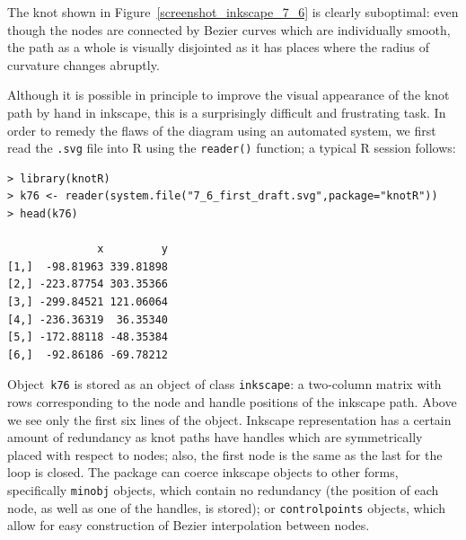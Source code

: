 \documentclass{birkjour}
\theoremstyle{definition}
\theoremstyle{remark}
\numberwithin{equation}{section}
\begin{document}
The knot shown in Figure~\ref{screenshot_inkscape_7_6} is clearly
suboptimal: even though the nodes are connected by Bezier curves which
are individually smooth, the path as a whole is visually disjointed as
it has places where the radius of curvature changes abruptly.

Although it is possible in principle to improve the visual appearance
of the knot path by hand in inkscape, this is a surprisingly difficult
and frustrating task.  In order to remedy the flaws of the diagram
using an automated system, we first read the {\tt .svg} file into R
using the {\tt reader()} function; a typical R session follows:

\begin{verbatim}
> library(knotR)
> k76 <- reader(system.file("7_6_first_draft.svg",package="knotR"))
> head(k76)

              x         y
[1,]  -98.81963 339.81898
[2,] -223.87754 303.35366
[3,] -299.84521 121.06064
[4,] -236.36319  36.35340
[5,] -172.88118 -48.35384
[6,]  -92.86186 -69.78212
\end{verbatim}

Object~{\tt k76} is stored as an object of class {\tt inkscape}: a
two-column matrix with rows corresponding to the node and handle
positions of the inkscape path.  Above we see only the first six lines
of the object.  Inkscape representation has a certain amount of
redundancy as knot paths have handles which are symmetrically placed
with respect to nodes; also, the first node is the same as the last
for the loop is closed.  The package can coerce inkscape objects to
other forms, specifically {\tt minobj} objects, which contain no
redundancy (the position of each node, as well as one of the handles,
is stored); or {\tt controlpoints} objects, which allow for easy
construction of Bezier interpolation between nodes.
\end{document}
